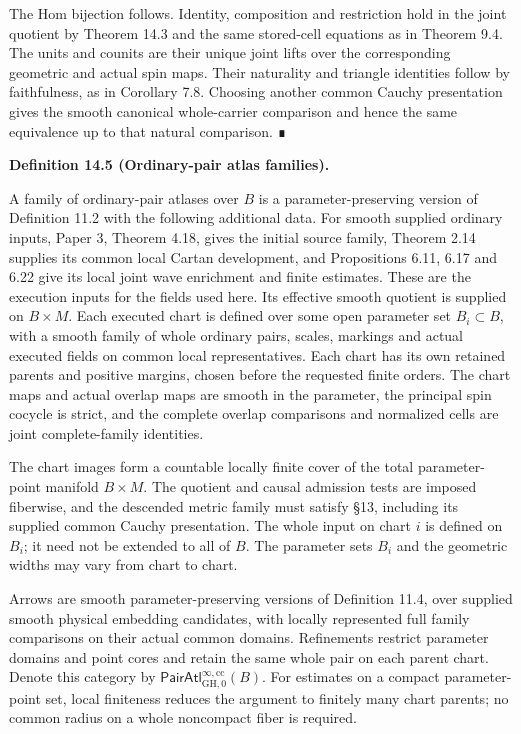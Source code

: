 \documentclass[
  english,
  11pt,
  reqno]{amsart}
\makeatletter
\newcommand{\pandocstatementheading}[1]{%
  \par\addpenalty{\@beginparpenalty}%
  \addvspace{.5\baselineskip plus .2\baselineskip minus .2\baselineskip}%
  {\normalfont\bfseries #1\par}%
  \nobreak\@afterindenttrue\@afterheading
}
\makeatother
\begin{document}
The Hom bijection follows. Identity, composition and restriction hold in
the joint quotient by Theorem 14.3 and the same stored-cell equations as
in Theorem 9.4. The units and counits are their unique joint lifts over
the corresponding geometric and actual spin maps. Their naturality and
triangle identities follow by faithfulness, as in Corollary 7.8.
Choosing another common Cauchy presentation gives the smooth canonical
whole-carrier comparison and hence the same equivalence up to that
natural comparison. ∎

\pandocstatementheading{\protect{}\label{def:ordinary-pair-atlas-families}Definition 14.5 (Ordinary-pair atlas families).}

A family of ordinary-pair atlases over \(B\) is a parameter-preserving
version of Definition 11.2 with the following additional data. For
smooth supplied ordinary inputs, Paper 3, Theorem 4.18, gives the
initial source family, Theorem 2.14 supplies its common local Cartan
development, and Propositions 6.11, 6.17 and 6.22 give its local joint
wave enrichment and finite estimates. These are the execution inputs for
the fields used here. Its effective smooth quotient is supplied on
\(B\times M\). Each executed chart is defined over some open parameter
set \(B_i\subset B\), with a smooth family of whole ordinary pairs,
scales, markings and actual executed fields on common local
representatives. Each chart has its own retained parents and positive
margins, chosen before the requested finite orders. The chart maps and
actual overlap maps are smooth in the parameter, the principal spin
cocycle is strict, and the complete overlap comparisons and normalized
cells are joint complete-family identities.

The chart images form a countable locally finite cover of the total
parameter-point manifold \(B\times M\). The quotient and causal
admission tests are imposed fiberwise, and the descended metric family
must satisfy §13, including its supplied common Cauchy presentation. The
whole input on chart \(i\) is defined on \(B_i\); it need not be
extended to all of \(B\). The parameter sets \(B_i\) and the geometric
widths may vary from chart to chart.

Arrows are smooth parameter-preserving versions of Definition 11.4, over
supplied smooth physical embedding candidates, with locally represented
full family comparisons on their actual common domains. Refinements
restrict parameter domains and point cores and retain the same whole
pair on each parent chart. Denote this category by
\(\mathsf{PairAtl}^{\infty,\mathrm{cc}}_{\mathrm{GH},0}(B)\). For
estimates on a compact parameter-point set, local finiteness reduces the
argument to finitely many chart parents; no common radius on a whole
noncompact fiber is required.
\end{document}
